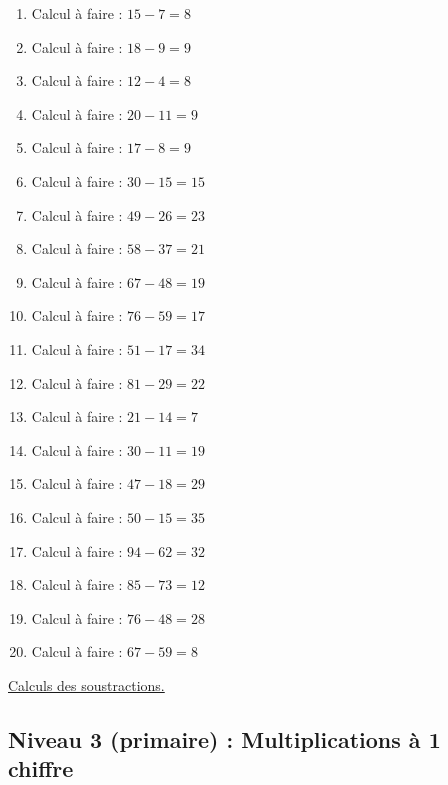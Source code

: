 \documentclass[11pt]{article}
\begin{document}
\begin{enumerate}
\item Calcul à faire :  \(15 - 7 = 8\)
\item Calcul à faire :  \(18 - 9 = 9\)
\item Calcul à faire :  \(12 - 4 = 8\)
\item Calcul à faire :  \(20 - 11 = 9\)
\item Calcul à faire :  \(17 - 8 = 9\)
\item Calcul à faire :  \(30 - 15 = 15\)
\item Calcul à faire :  \(49 - 26 = 23\)
\item Calcul à faire :  \(58 - 37 = 21\)
\item Calcul à faire :  \(67 - 48 = 19\)
\item Calcul à faire :  \(76 - 59 = 17\)
\item Calcul à faire :  \(51 - 17 = 34\)
\item Calcul à faire :  \(81 - 29 = 22\)
\item Calcul à faire :  \(21 - 14 = 7\)
\item Calcul à faire :  \(30 - 11 = 19\)
\item Calcul à faire :  \(47 - 18 = 29\)
\item Calcul à faire :  \(50 - 15 = 35\)
\item Calcul à faire :  \(94 - 62 = 32\)
\item Calcul à faire :  \(85 - 73 = 12\)
\item Calcul à faire :  \(76 - 48 = 28\)
\item Calcul à faire :  \(67 - 59 = 8\)
\end{enumerate}




\hyperref[orga47d3aa]{Calculs des soustractions.}



\newpage

\subsection{Niveau 3 (primaire) : Multiplications à 1 chiffre}
\label{sec:orgcb4e638}
\label{org14f83f5}
\end{document}
